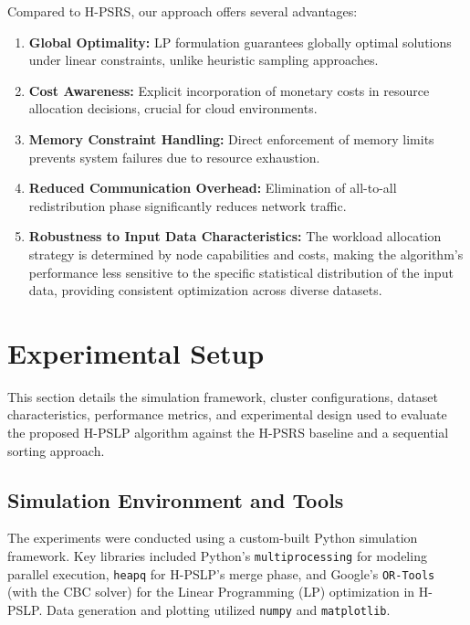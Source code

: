 \documentclass[]{interact}
\theoremstyle{plain}
\theoremstyle{definition}
\theoremstyle{remark}
\begin{document}
Compared to H-PSRS, our approach offers several advantages:

\begin{enumerate}
\item \textbf{Global Optimality:} LP formulation guarantees globally optimal solutions under linear constraints, unlike heuristic sampling approaches.

\item \textbf{Cost Awareness:} Explicit incorporation of monetary costs in resource allocation decisions, crucial for cloud environments.

\item \textbf{Memory Constraint Handling:} Direct enforcement of memory limits prevents system failures due to resource exhaustion.

\item \textbf{Reduced Communication Overhead:} Elimination of all-to-all redistribution phase significantly reduces network traffic.

\item \textbf{Robustness to Input Data Characteristics:} The workload allocation strategy is determined by node capabilities and costs, making the algorithm's performance less sensitive to the specific statistical distribution of the input data, providing consistent optimization across diverse datasets.
\end{enumerate}










\section{Experimental Setup}

This section details the simulation framework, cluster configurations, dataset characteristics, performance metrics, and experimental design used to evaluate the proposed H-PSLP algorithm against the H-PSRS baseline and a sequential sorting approach.

\subsection{Simulation Environment and Tools}
The experiments were conducted using a custom-built Python simulation framework. Key libraries included Python's \texttt{multiprocessing} for modeling parallel execution, \texttt{heapq} for H-PSLP's merge phase, and Google's \texttt{OR-Tools} (with the CBC solver) for the Linear Programming (LP) optimization in H-PSLP. Data generation and plotting utilized \texttt{numpy} and \texttt{matplotlib}.
\end{document}
